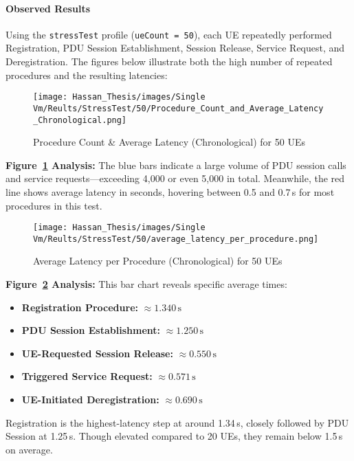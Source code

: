 \paragraph{Observed Results}
Using the \texttt{stressTest} profile (\texttt{ueCount = 50}), each UE repeatedly performed Registration, PDU Session Establishment, Session Release, Service Request, and Deregistration. The figures below illustrate both the high number of repeated procedures and the resulting latencies:

\begin{figure}[H]
    \centering
    \texttt{[image: Hassan\_Thesis/images/Single Vm/Reults/StressTest/50/Procedure\_Count\_and\_Average\_Latency\_Chronological.png]}
    \caption{Procedure Count \& Average Latency (Chronological) for 50 UEs}
    \label{fig:50ue-count-latency}
\end{figure}

\noindent
\textbf{Figure~\ref{fig:50ue-count-latency} Analysis:}  
The blue bars indicate a large volume of PDU session calls and service requests—exceeding 4,000 or even 5,000 in total. Meanwhile, the red line shows average latency in seconds, hovering between 0.5 and 0.7\,s for most procedures in this test.

\vspace{0.75em}
\begin{figure}[H]
    \centering
    \texttt{[image: Hassan\_Thesis/images/Single Vm/Reults/StressTest/50/average\_latency\_per\_procedure.png]}
    \caption{Average Latency per Procedure (Chronological) for 50 UEs}
    \label{fig:50ue-avg-latency}
\end{figure}

\noindent
\textbf{Figure~\ref{fig:50ue-avg-latency} Analysis:}  
This bar chart reveals specific average times:
\begin{itemize}
    \item \textbf{Registration Procedure:} $\approx 1.340\,\text{s}$
    \item \textbf{PDU Session Establishment:} $\approx 1.250\,\text{s}$
    \item \textbf{UE-Requested Session Release:} $\approx 0.550\,\text{s}$
    \item \textbf{Triggered Service Request:} $\approx 0.571\,\text{s}$
    \item \textbf{UE-Initiated Deregistration:} $\approx 0.690\,\text{s}$
\end{itemize}
Registration is the highest-latency step at around 1.34\,s, closely followed by PDU Session at 1.25\,s. Though elevated compared to 20 UEs, they remain below 1.5\,s on average.

